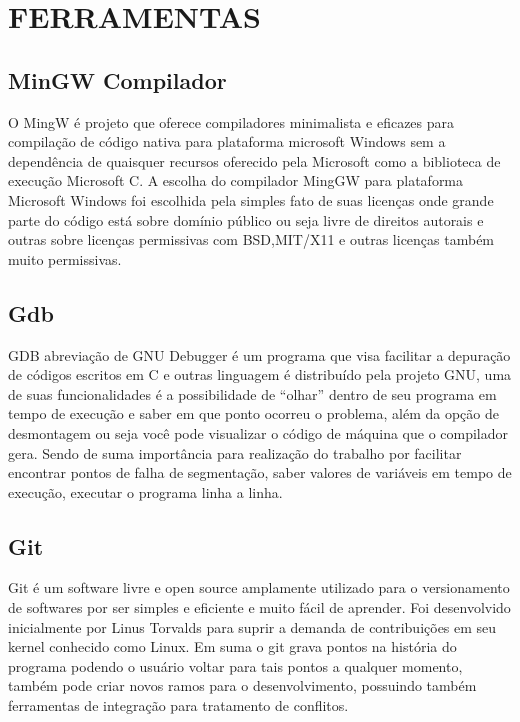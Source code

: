 \documentclass[
	12pt,				%
	oneside,			%
	a4paper,			%
  section=TITLE,
	brazil,				%
	]{abntex2}
\begin{document}
\section{FERRAMENTAS}

\subsection{MinGW Compilador}

O MingW é projeto que oferece compiladores minimalista e eficazes para
compilação de código nativa para plataforma microsoft Windows sem a dependência de
quaisquer recursos oferecido pela Microsoft como a biblioteca de execução Microsoft C. A
escolha do compilador MingGW para plataforma Microsoft Windows foi escolhida pela
simples fato de suas licenças onde grande parte do código está sobre domínio público ou seja
livre de direitos autorais e outras sobre licenças permissivas com BSD,MIT/X11 e outras
licenças também muito permissivas.

\subsection{Gdb}

GDB abreviação de GNU Debugger é um programa que visa facilitar a depuração
de códigos escritos em C e outras linguagem é distribuído pela projeto GNU, uma de suas
funcionalidades é a possibilidade de “olhar” dentro de seu programa em tempo de execução e
saber em que ponto ocorreu o problema, além da opção de desmontagem ou seja você pode
visualizar o código de máquina que o compilador gera. Sendo de suma importância para
realização do trabalho por facilitar encontrar pontos de falha de segmentação, saber valores de
variáveis em tempo de execução, executar o programa linha a linha.

\subsection{Git}


Git é um software livre e open source amplamente utilizado para o versionamento
de softwares por ser simples e eficiente e muito fácil de aprender. Foi
desenvolvido inicialmente por Linus Torvalds para suprir a demanda de
contribuições em seu kernel conhecido como Linux. Em suma o git grava pontos na
história do programa podendo o usuário voltar para tais pontos a qualquer
momento, também pode criar novos ramos para o desenvolvimento, possuindo também
ferramentas de integração para tratamento de conflitos.
\end{document}
